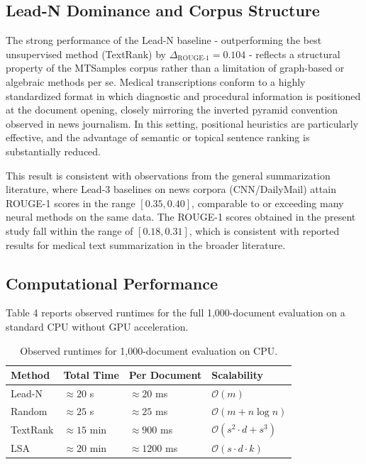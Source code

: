 \documentclass[12pt,twoside,en,win]{bmzhart}
\begin{document}
	\subsection{Lead-N Dominance and Corpus Structure}

	The strong performance of the Lead-N baseline - outperforming the best unsupervised method (TextRank) by 
	$\Delta_{\text{ROUGE-1}} = 0.104$ - reflects a structural property of the MTSamples corpus rather than a limitation of 
	graph-based or algebraic methods per se. Medical transcriptions conform to a highly standardized format in which diagnostic 
	and procedural information is positioned at the document opening, closely mirroring the inverted pyramid convention 
	observed in news journalism. In this setting, positional heuristics are particularly effective, and the advantage of 
	semantic or topical sentence ranking is substantially reduced.

	This result is consistent with observations from the general summarization literature, where Lead-3 baselines on 
	news corpora (CNN/DailyMail) attain ROUGE-1 scores in the range $[0.35, 0.40]$, comparable to or exceeding many 
	neural methods on the same data. The ROUGE-1 scores obtained in the present study fall within the range of 
	$[0.18, 0.31]$, which is consistent with reported results for medical text summarization in the broader literature.

	\subsection{Computational Performance}

	Table 4 reports observed runtimes for the full 1,000-document evaluation on a standard CPU without GPU acceleration.

	\begin{table}[h]
	\centering
	\caption{Observed runtimes for 1,000-document evaluation on CPU.}
	\label{tab:runtime-comparison}
	\begin{tabular}{@{}llll@{}}
	\toprule
	\textbf{Method} & \textbf{Total Time} & \textbf{Per Document} & \textbf{Scalability} \\ \midrule
	Lead-N   & $\approx 20$ s  & $\approx 20$ ms   & $\mathcal{O}(m)$ \\
	Random   & $\approx 25$ s  & $\approx 25$ ms   & $\mathcal{O}(m + n \log{n})$ \\
	TextRank & $\approx 15$ min & $\approx 900$ ms  & $\mathcal{O}(s^{2} \cdot d + s^{3})$ \\
	LSA      & $\approx 20$ min & $\approx 1200$ ms & $\mathcal{O}(s \cdot d \cdot k)$ \\ \bottomrule
	\end{tabular}
	\end{table}
\end{document}
